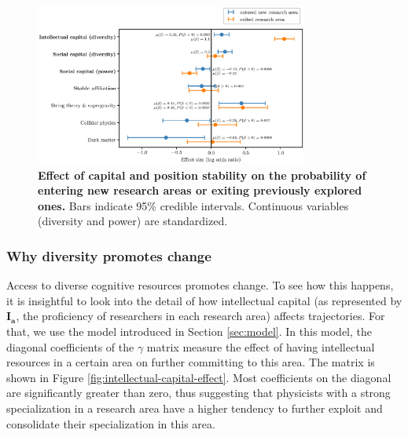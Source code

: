 \documentclass{article}
\begin{document}

\begin{figure}[h]
    \centering
    \includegraphics[width=0.8\textwidth]{plots/exited_score_effects_entropy_magnitude.eps}
    \caption{\textbf{Effect of capital and position stability on the probability of entering new research areas or exiting previously explored ones.} Bars indicate 95\% credible intervals. Continuous variables (diversity and power) are standardized.}
    \label{fig:diversification_score_effect}
\end{figure}


\subsubsection{Why diversity promotes change}

Access to diverse cognitive resources promotes change. To see how this happens, it is insightful to look into the detail of how intellectual capital (as represented by $\bm{I_a}$, the proficiency of researchers in each research area) affects trajectories. For that, we use the model introduced in Section \ref{sec:model}. In this model, the diagonal coefficients of the $\gamma$ matrix measure the effect of having intellectual resources in a certain area on further committing to this area. The matrix is shown in Figure \ref{fig:intellectual-capital-effect}. Most coefficients on the diagonal are significantly greater than zero, thus suggesting that physicists with a strong specialization in a research area have a higher tendency to further exploit and consolidate their specialization in this area.  %
\end{document}
